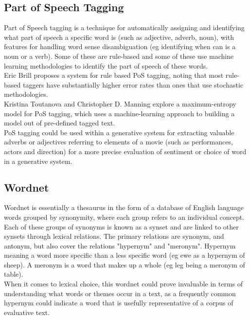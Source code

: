 \subsection{Part of Speech Tagging}
Part of Speech tagging is a technique for automatically assigning and identifying what part of speech a specific word is (such as adjective, adverb, noun), with features for handling word sense disambiguation (eg identifying when can is a noun or a verb). Some of these are rule-based and some of these use machine learning methodologies to identify the part of speech of these words.\\
Eric Brill proposes a system for rule based PoS tagging, noting that most rule-based taggers have substantially higher error rates than ones that use stochastic methodologies.\cite{RBSPOS}\\

Kristina Toutanova and Christopher D. Manning explore a maximum-entropy model for PoS tagging, which uses a machine-learning approach to building a model out of pre-defined tagged text. \cite{POSTagging} \\
PoS tagging could be used within a generative system for extracting valuable adverbs or adjectives referring to elements of a movie (such as performances, actors and direction) for a more precise evaluation of sentiment or choice of word in a generative system.
\subsection{Wordnet}

Wordnet is essentially a thesaurus in the form of a database of English language words grouped by synonymity, where each group refers to an individual concept. Each of these groups of synonyms is known as a synset and are linked to other synsets through lexical relations. \cite{Wordnet}
The primary relations are synonym, and antonym, but also cover the relations "hypernym" and "meronym". Hypernym meaning a word more specific than a less specific word (eg ewe as a hypernym of sheep). A meronym is a word that makes up a whole (eg leg being a meronym of table). \\

When it comes to lexical choice, this wordnet could prove invaluable in terms of understanding what words or themes occur in a text, as a frequently common hypernym could indicate a word that is usefully representative of a corpus of evaluative text.


